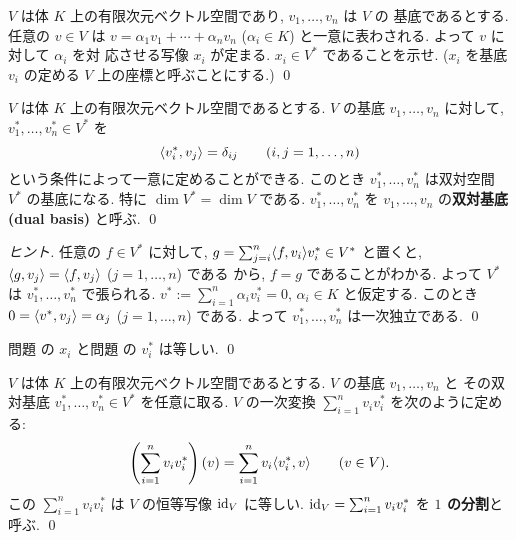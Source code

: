 \documentclass[12pt,twoside]{jarticle}
\begin{document}

\begin{question}[基底の定める座標]
  \label{q:x_i}
  $V$ は体 $K$ 上の有限次元ベクトル空間であり, $v_1,\ldots,v_n$ は $V$ の
  基底であるとする. 任意の $v\in V$ は $v=\alpha_1v_1+\cdots+\alpha_nv_n$ 
  ($\alpha_i\in K$) と一意に表わされる.  よって $v$ に対して $\alpha_i$ を対
  応させる写像 $x_i$ が定まる.  $x_i\in V^*$ であることを示せ. 
  ($x_i$ を基底 $v_i$ の定める $V$ 上の座標と呼ぶことにする.)
  \qed
\end{question}


\begin{question}[双対基底]
  \label{q:dual-basis}
  $V$ は体 $K$ 上の有限次元ベクトル空間であるとする.
  $V$ の基底 $v_1,\ldots,v_n$ に対して,
  $v^*_1,\ldots,v^*_n\in V^*$ を
  \begin{equation*}
    \langle v^*_i, v_j \rangle = \delta_{ij}
    \qquad (i,j=1,\ldots,n)
  \end{equation*}
  という条件によって一意に定めることができる.
  このとき $v^*_1,\ldots,v^*_n$ は双対空間 $V^*$ の基底になる.
  特に $\dim V^* = \dim V$ である.
  $v^*_1,\ldots,v^*_n$ を $v_1,\ldots,v_n$ の{\bf 双対基底 (dual basis)} 
  と呼ぶ.
  \qed
\end{question}

\begin{proof}[ヒント]
  任意の $f\in V^*$ に対して, $g=\sum_{j=i}^n\langle f,v_i\rangle v^*_i\in V^*$ 
  と置くと, $\langle g,v_j\rangle = \langle f,v_j\rangle$ ($j=1,\ldots,n$) である
  から, $f=g$ であることがわかる.  
  よって $V^*$ は $v^*_1,\dots,v^*_n$ で張られる.
  $v^*:=\sum_{i=1}^n\alpha_i v^*_i=0$, $\alpha_i\in K$ 
  と仮定する. このとき $0=\langle v^*,v_j\rangle=\alpha_j$ ($j=1,\ldots,n$) である.
  よって $v^*_1,\dots,v^*_n$ は一次独立である.
  \qed
\end{proof}

\begin{rem}
  問題  の $x_i$ と問題  の $v^*_i$ は等しい.
  \qed
\end{rem}


\begin{question}[1の分解]
  \label{q:1=sum-vv*}
  $V$ は体 $K$ 上の有限次元ベクトル空間であるとする.
  $V$ の基底 $v_1,\ldots,v_n$ と
  その双対基底 $v^*_1,\ldots,v^*_n\in V^*$ を任意に取る.
  $V$ の一次変換 $\sum_{i=1}^n v_iv_i^*$ を次のように定める:
  \begin{equation*}
    \left(\sum_{i=1}^n v_iv_i^*\right)(v)
    = \sum_{i=1}^n v_i \langle v_i^*, v\rangle
    \qquad (v\in V).
  \end{equation*}
  この $\sum_{i=1}^n v_iv_i^*$ は $V$ の恒等写像 $\mathop{\mathrm{id}}\nolimits_V$ に等しい.
  $\mathop{\mathrm{id}}\nolimits_V = \sum_{i=1}^n v_iv_i^*$ を {\bf $1$ の分割}と呼ぶ.
  \qed
\end{question}
\end{document}
